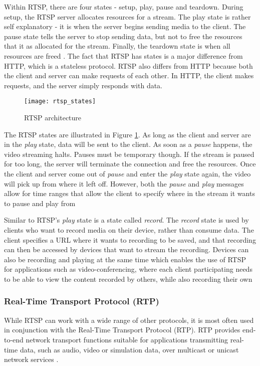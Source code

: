 \documentclass[12pt]{article}
\begin{document}
Within RTSP, there are four states - setup, play, pause and teardown.  During setup, the RTSP server allocates resources for a stream.  The play state is rather self explanatory - it is when the server begins sending media to the client.  The pause state tells the server to stop sending data, but not to free the resources that it as allocated for the stream.  Finally, the teardown state is when all resources are freed \cite{rtsp_ieee}.  The fact that RTSP has states is a major difference from HTTP, which is a stateless protocol.  RTSP also differs from HTTP because both the client and server can make requests of each other.  In HTTP, the client makes requests, and the server simply responds with data.

\begin{figure}[htp]
  \begin{center}
    \texttt{[image: rtsp\_states]}
    \caption{RTSP architecture}
    \label{fig:rtsp_states}
  \end{center}
\end{figure}


The RTSP states are illustrated in Figure \ref{fig:rtsp_states}.  As long as the client and server are in the \textit{play} state, data will be sent to the client.  As soon as a \textit{pause} happens, the video streaming halts.  Pauses must be temporary though.  If the stream is paused for too long, the server will terminate the connection and free the resources.  Once the client and server come out of \textit{pause} and enter the \textit{play} state again, the video will pick up from where it left off.  However, both the \textit{pause} and \textit{play} messages allow for time ranges that allow the client to specify where in the stream it wants to pause and play from \cite{rtsp_ieee}

Similar to RTSP's \textit{play} state is a state called \textit{record}.  The \textit{record} state is used by clients who want to record media on their device, rather than consume data.  The client specifies a URL where it wants to recording to be saved, and that recording can then be accessed by devices that want to stream the recording.  Devices can also be recording and playing at the same time which enables the use of RTSP for applications such as video-conferencing, where each client participating needs to be able to view the content recorded by others, while also recording their own \cite{rtsp_ieee}

\subsubsection{Real-Time Transport Protocol (RTP)}
While RTSP can work with a wide range of other protocols, it is most often used in conjunction with the Real-Time Transport Protocol (RTP).  RTP provides end-to-end network transport functions suitable for applications transmitting real-time data, such as audio, video or simulation data, over multicast or unicast network services \cite{schulzrinne_casner_frederick_jacobson_2003}.
\end{document}
